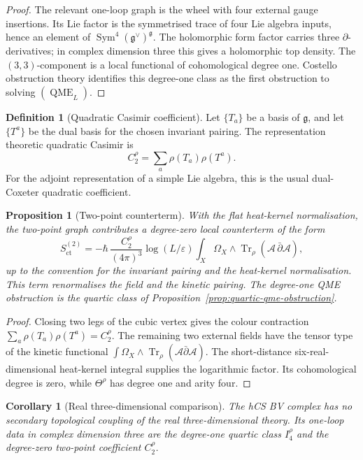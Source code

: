 \documentclass[11pt]{amsart}
\providecommand{\dbar}{\bar{\partial}}
\providecommand{\gfrak}{\mathfrak{g}}
\providecommand{\Tr}{\operatorname{Tr}}
\providecommand{\Sym}{\operatorname{Sym}}
\providecommand{\QME}{\operatorname{QME}}
\providecommand{\cA}{\mathcal{A}}
\theoremstyle{plain}
\newtheorem{proposition}[theorem]{Proposition}
\newtheorem{corollary}[theorem]{Corollary}
\theoremstyle{definition}
\newtheorem{definition}[theorem]{Definition}
\theoremstyle{remark}
\begin{document}
\begin{proof}
The relevant one-loop graph is the wheel with four external gauge
insertions.  Its Lie factor is the symmetrised trace of four Lie algebra
inputs, hence an element of \(\Sym^4(\gfrak^\vee)^{\gfrak}\).  The
holomorphic form factor carries three \(\partial\)-derivatives; in
complex dimension three this gives a holomorphic top density.  The
\((3,3)\)-component is a local functional of cohomological degree one.
Costello obstruction theory identifies this degree-one class as the
first obstruction to solving \((\QME_L)\).
\end{proof}

\begin{definition}[Quadratic Casimir coefficient]
\label{def:quadratic-casimir}
Let \(\{T_a\}\) be a basis of \(\gfrak\), and let \(\{T^a\}\) be the
dual basis for the chosen invariant pairing.  The representation
theoretic quadratic Casimir is
\[
  C_2^\rho=\sum_a\rho(T_a)\rho(T^a).
\]
For the adjoint representation of a simple Lie algebra, this is the
usual dual-Coxeter quadratic coefficient.
\end{definition}

\begin{proposition}[Two-point counterterm]
\label{prop:two-point-counterterm}
With the flat heat-kernel normalisation, the two-point graph contributes
a degree-zero local counterterm of the form
\[
  S_{\mathrm{ct}}^{(2)}
  =
  -\hbar\,\frac{C_2^\rho}{(4\pi)^3}
  \log(L/\varepsilon)
  \int_X\Omega_X\wedge\Tr_\rho(\cA\,\dbar\cA),
\]
up to the convention for the invariant pairing and the heat-kernel
normalisation.  This term renormalises the field and the kinetic
pairing.  The degree-one QME obstruction is the quartic class of
Proposition~\ref{prop:quartic-qme-obstruction}.
\end{proposition}

\begin{proof}
Closing two legs of the cubic vertex gives the colour contraction
\(\sum_a\rho(T_a)\rho(T^a)=C_2^\rho\).  The remaining two external
fields have the tensor type of the kinetic functional
\(\int\Omega_X\wedge\Tr_\rho(\cA\dbar\cA)\).  The short-distance
six-real-dimensional heat-kernel integral supplies the logarithmic
factor.  Its cohomological degree is zero, while
\(\Theta^\rho\) has degree one and arity four.
\end{proof}

\begin{corollary}[Real three-dimensional comparison]
\label{cor:three-dimensional-comparison}
The hCS BV complex has no secondary topological coupling of the real
three-dimensional theory.  Its one-loop data in complex dimension three
are the degree-one quartic class \(I_4^\rho\) and the degree-zero
two-point coefficient \(C_2^\rho\).
\end{corollary}
\end{document}
